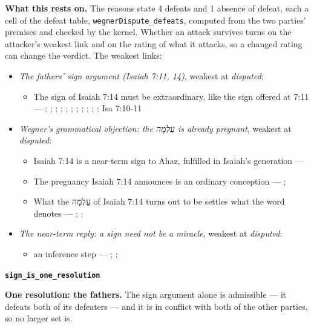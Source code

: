 \documentclass[11pt]{article}
\begin{document}
\par\noindent\textbf{What this rests on.} The reasons state 4 defeats and 1 absence of defeat, each a cell of the defeat table, \texttt{wegner\allowbreak{}Dispute\_\allowbreak{}defeats}, computed from the two parties' premises and checked by the kernel. Whether an attack survives turns on the attacker's weakest link and on the rating of what it attacks, so a changed rating can change the verdict. The weakest links:
\begin{itemize}
\item \emph{The fathers’ sign argument (Isaiah 7:11, 14)}, weakest at \emph{disputed}:
\begin{itemize}
\item The sign of Isaiah 7:14 must be extraordinary, like the sign offered at 7:11 --- \cite[I.35]{origen-against-celsus-248}; \cite[84]{justin-dialogue-with-trypho-160}; \cite[III.21.6]{irenaeus-against-heresies-180}; \cite[9]{tertullian-answer-to-the-jews-200}; \cite[VII.1]{eusebius-demonstratio-evangelica-315}; \cite[12.22]{cyril-jerusalem-catechetical-lectures-350}; \cite[5]{chrysostom-homilies-matthew-390}; \cite[ad loc. Isa 7:14]{jerome-commentary-isaiah-410}; \cite[ad loc. Isa 7:14]{cyril-alexandria-commentary-isaiah}; \cite[ad loc. Isa 7:14]{theodoret-commentary-isaiah}; \cite[474]{postell-isaiah-messianic-2025}; Isa 7:10-11
\end{itemize}
\item \emph{Wegner’s grammatical objection: the עַלְמָה is already pregnant}, weakest at \emph{disputed}:
\begin{itemize}
\item Isaiah 7:14 is a near-term sign to Ahaz, fulfilled in Isaiah’s generation --- \cite{brown-birth-messiah-1993}
\item The pregnancy Isaiah 7:14 announces is an ordinary conception --- \cite[476--478]{wegner-virgin-births-2011}; \cite[474]{postell-isaiah-messianic-2025}
\item What the עַלְמָה of Isaiah 7:14 turns out to be settles what the word denotes --- \cite[471--472]{wegner-virgin-births-2011}; \cite[468]{postell-isaiah-messianic-2025}; \cite[152]{rico-gentry-infant-king-2020}
\end{itemize}
\item \emph{The near-term reply: a sign need not be a miracle}, weakest at \emph{disputed}:
\begin{itemize}
\item an inference step --- \cite[64--65]{rhodea-did-matthew-conceive-2013}; \cite[469--470]{wegner-virgin-births-2011}; \cite[474]{postell-isaiah-messianic-2025}
\end{itemize}
\end{itemize}
\par\medskip\noindent\textbf{\texttt{sign\_\allowbreak{}is\_\allowbreak{}one\_\allowbreak{}resolution}}\par\nobreak\noindent
\textbf{One resolution: the fathers.} The sign argument alone is admissible — it defeats both of its defeaters — and it is in conflict with both of the other parties, so no larger set is.
\end{document}

